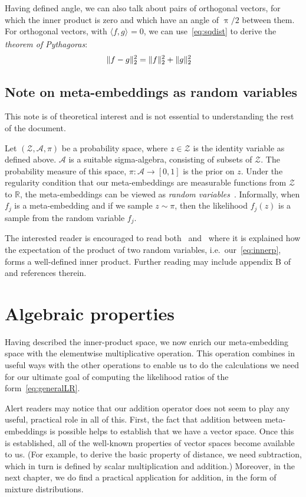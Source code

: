 \documentclass[a4paper,oneside,12pt,english]{report}
\def\expv#1#2{\bigl\langle#1\bigr\rangle_{#2}}
\def\R{\mathbb{R}}
\def\Zset{\mathcal{Z}}
\def\Zset{\mathcal{Z}}
\def\dot#1#2{\expv{#1,#2}{}}
\begin{document}
Having defined angle, we can also talk about pairs of orthogonal vectors, for which the inner product is zero and which have an angle of $\uppi/2$ between them. For orthogonal vectors, with $\dot{f}{g}=0$, we can use~\eqref{eq:sqdist} to derive the \emph{theorem of Pythagoras}:
\begin{align}
\label{eq:Pythagoras}
\lVert f-g\rVert_2^2 &= \lVert f\rVert_2^2 +\lVert g\rVert_2^2 
\end{align} 


\subsection{Note on meta-embeddings as random variables}
\def\Aset{\mathcal{A}}
This note is of theoretical interest and is not essential to understanding the rest of the document. 

Let $(\Zset,\Aset,\pi)$ be a probability space, where $z\in\Zset$ is the identity variable as defined above. $\Aset$ is a suitable sigma-algebra, consisting of subsets of $\Zset$. The probability measure of this space, $\pi:\Aset\to[0,1]$ is the prior on $z$. Under the regularity condition that our meta-embeddings are measurable functions from $\Zset$ to $\R$, the meta-embeddings can be viewed as \emph{random variables}~\cite{Billingsley}. Informally, when $f_j$ is a meta-embedding and if we sample $z\sim\pi$, then the likelihood $f_j(z)$ is a sample from the random variable $f_j$. 

The interested reader is encouraged to read both~\cite{random} and~\cite{ouwehand} where it is explained how the expectation of the product of two random variables, i.e.\ our~\eqref{eq:innerp}, forms a well-defined inner product. Further reading may include appendix B of~\cite{Bigoni} and references therein.


\section{Algebraic properties}
Having described the inner-product space, we now enrich our meta-embedding space with the elementwise multiplicative operation. This operation combines in useful ways with the other operations to enable us to do the calculations we need for our ultimate goal of computing the likelihood ratios of the form~\eqref{eq:generalLR}.

Alert readers may notice that our addition operator does not seem to play any useful, practical role in all of this. First, the fact that addition between meta-embeddings is possible helps to establish that we have a vector space. Once this is established, all of the well-known properties of vector spaces become available to us. (For example, to derive the basic property of distance, we need subtraction, which in turn is defined by scalar multiplication and addition.) Moreover, in the next chapter, we do find a practical application for addition, in the form of mixture distributions.  
\end{document}
